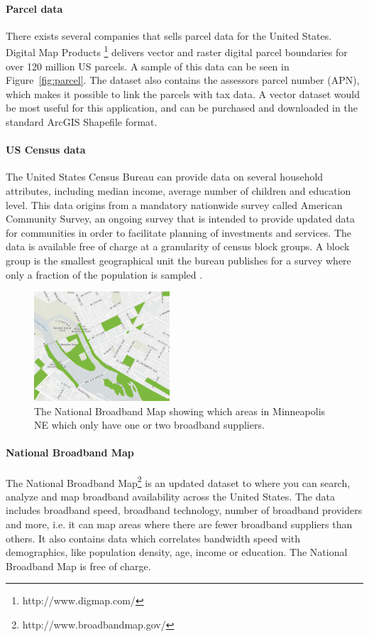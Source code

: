 \documentclass[twocolumn]{article}
\begin{document}
\paragraph{Parcel data}

\label{par:Parcel data}
There exists several companies that sells parcel data for the United States. Digital Map Products \footnote{http://www.digmap.com/} delivers vector and raster digital parcel boundaries for over 120 million US parcels. A sample of this data can be seen in Figure~\ref{fig:parcel}. The dataset also contains the assessors parcel number (APN), which makes it possible to link the parcels with tax data. A vector dataset would be most useful for this application, and can be purchased and downloaded in the standard ArcGIS Shapefile format. 

\paragraph{US Census data}
\label{par:Us Census data}
The United States Census Bureau can provide data on several household attributes, including median income, average number of children and education level. This data origins from a mandatory nationwide survey called American Community Survey, an ongoing survey that is intended to provide updated data for communities in order to facilitate planning of investments and services. The data is available free of charge at a granularity of census block groups. A block group is the smallest geographical unit the bureau publishes for a survey where only a fraction of the population is sampled \cite{Wikipedia_contributors2014-fq}. 

\begin{figure}
  \centering
  \includegraphics[width=0.45\textwidth]{img/nbm.png}
  \caption{The National Broadband Map showing which areas in Minneapolis NE which only have one or two broadband suppliers.}
  \label{fig:nbm}
\end{figure}
\paragraph{National Broadband Map}
\label{par:National Broadband Map}
The National Broadband Map\footnote{http://www.broadbandmap.gov/} is an updated dataset to where you can search, analyze and map broadband availability across the United States. The data includes broadband speed, broadband technology, number of broadband providers and more, i.e. it can map areas where there are fewer broadband suppliers than others. It also contains data which correlates bandwidth speed with demographics, like population density, age, income or education. The National Broadband Map is free of charge.
\end{document}
